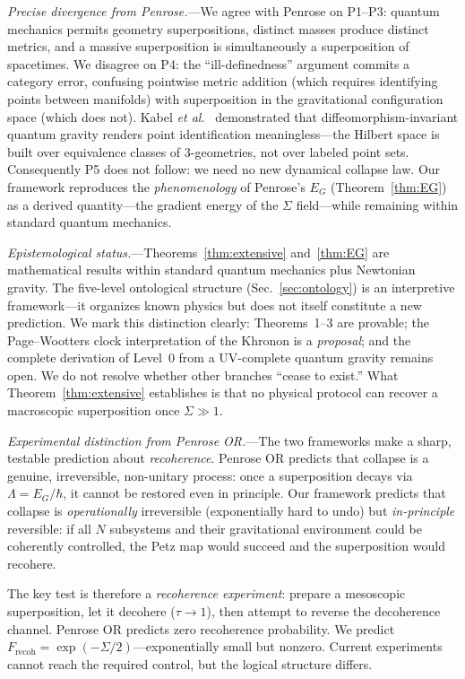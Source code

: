 \documentclass[prl,twocolumn,superscriptaddress,longbibliography,floatfix]{revtex4-2}
\newcommand{\tauasym}{\tau}
\begin{document}
\emph{Precise divergence from Penrose.}---We agree with Penrose on
P1--P3: quantum mechanics permits geometry superpositions, distinct
masses produce distinct metrics, and a massive superposition is
simultaneously a superposition of spacetimes.  We disagree on P4:
the ``ill-definedness'' argument commits a category error, confusing
pointwise metric addition (which requires identifying points between
manifolds) with superposition in the gravitational configuration
space (which does not).  Kabel \emph{et al.}~\cite{Kabel2024}
demonstrated that diffeomorphism-invariant quantum gravity renders
point identification meaningless---the Hilbert space is built over
equivalence classes of 3-geometries, not over labeled point sets.
Consequently P5 does not follow: we need no new dynamical collapse
law.  Our framework reproduces the \emph{phenomenology} of
Penrose's $E_G$ (Theorem~\ref{thm:EG}) as a derived quantity---the
gradient energy of the $\Sigma$ field---while remaining within
standard quantum mechanics.

\emph{Epistemological status.}---Theorems~\ref{thm:extensive}
and~\ref{thm:EG} are mathematical results within standard quantum
mechanics plus Newtonian gravity.  The five-level ontological
structure (Sec.~\ref{sec:ontology}) is an interpretive
framework---it organizes known physics but does not itself
constitute a new prediction.  We mark this distinction clearly:
Theorems~1--3 are provable; the Page--Wootters clock
interpretation of the Khronon is a \emph{proposal}; and the
complete derivation of Level~0 from a UV-complete quantum gravity
remains open.  We do not resolve whether other branches ``cease to
exist.''  What Theorem~\ref{thm:extensive} establishes is that no
physical protocol can recover a macroscopic superposition once
$\Sigma \gg 1$.

\emph{Experimental distinction from Penrose OR.}---The two
frameworks make a sharp, testable prediction about
\emph{recoherence}.  Penrose OR predicts that collapse is a
genuine, irreversible, non-unitary process: once a superposition
decays via $\Lambda = E_G/\hbar$, it cannot be restored even in
principle.  Our framework predicts that collapse is
\emph{operationally} irreversible (exponentially hard to undo) but
\emph{in-principle} reversible: if all $N$ subsystems and their
gravitational environment could be coherently controlled, the Petz
map would succeed and the superposition would recohere.

The key test is therefore a \emph{recoherence experiment}: prepare a
mesoscopic superposition, let it decohere ($\tauasym \to 1$), then
attempt to reverse the decoherence channel.  Penrose OR predicts
zero recoherence probability.  We predict
$F_{\mathrm{recoh}} = \exp(-\Sigma/2)$---exponentially small but
nonzero.  Current experiments cannot reach the required control, but
the logical structure differs.
\end{document}
